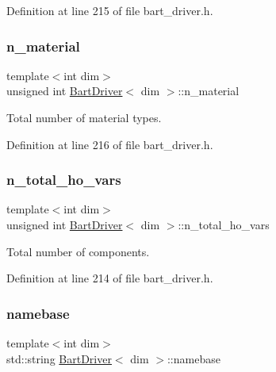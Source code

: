Definition at line 215 of file bart\+\_\+driver.\+h.

\mbox{\label{class_bart_driver_ae6c9141662b95c89b674ccdc04e9233f}} 
\subsubsection{\texorpdfstring{n\+\_\+material}{n\_material}}
{\footnotesize\ttfamily template$<$int dim$>$ \\
unsigned int \hyperlink{class_bart_driver}{Bart\+Driver}$<$ dim $>$\+::n\+\_\+material\hspace{0.3cm}{\ttfamily [private]}}



Total number of material types. 



Definition at line 216 of file bart\+\_\+driver.\+h.

\mbox{\label{class_bart_driver_ab290f0bd63869bf124163f68e1be1a6a}} 
\subsubsection{\texorpdfstring{n\+\_\+total\+\_\+ho\+\_\+vars}{n\_total\_ho\_vars}}
{\footnotesize\ttfamily template$<$int dim$>$ \\
unsigned int \hyperlink{class_bart_driver}{Bart\+Driver}$<$ dim $>$\+::n\+\_\+total\+\_\+ho\+\_\+vars\hspace{0.3cm}{\ttfamily [private]}}



Total number of components. 



Definition at line 214 of file bart\+\_\+driver.\+h.

\mbox{\label{class_bart_driver_a34229e58237aaac1551db7a3ec140e1c}} 
\subsubsection{\texorpdfstring{namebase}{namebase}}
{\footnotesize\ttfamily template$<$int dim$>$ \\
std\+::string \hyperlink{class_bart_driver}{Bart\+Driver}$<$ dim $>$\+::namebase\hspace{0.3cm}{\ttfamily [private]}}



